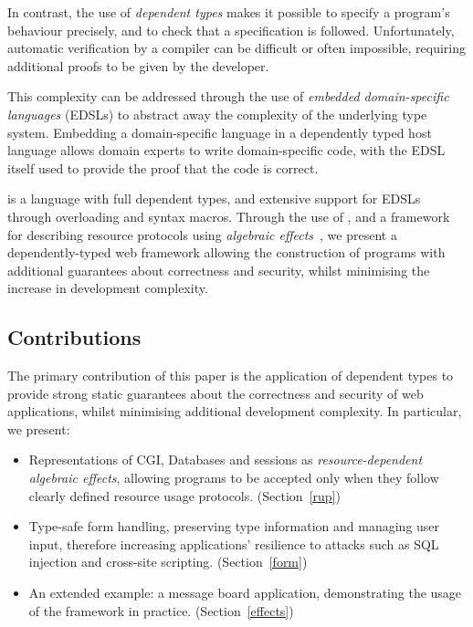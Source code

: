 In contrast, the use of \textit{dependent types} makes it possible
to specify a program's behaviour precisely, and to check that a 
specification is followed.
%
Unfortunately, automatic verification by a compiler can be difficult or
often impossible, requiring additional proofs to be given by the developer.

This complexity can be addressed through the use of \textit{embedded
domain-specific languages} (EDSLs) to abstract away the complexity of the
underlying type system. Embedding a domain-specific language in
a dependently typed host language
allows domain experts to write 
domain-specific code, with the EDSL itself used to provide the proof that the
code is correct.

\idris{} \cite{brady2013idris} is a language with full dependent types, and
extensive support for EDSLs through overloading and syntax macros. Through the
use of \idris{}, and a framework for describing resource protocols using
\emph{algebraic effects}~\cite{brady:effects}, we
present a dependently-typed web framework allowing the construction of
programs with additional guarantees about correctness and security, whilst
minimising the increase in development complexity. 

\subsection{Contributions}
The primary contribution of this paper is the application of 
dependent types to provide strong static guarantees
about the correctness and security of web applications, whilst minimising
additional development complexity. In particular, we present:

\begin{itemize}
\item Representations of CGI, Databases and sessions as
\textit{resource-dependent algebraic effects}, allowing programs to be accepted
only when they follow clearly defined resource usage protocols. 
(Section~\ref{rup})

\item Type-safe form handling, preserving type information and managing
user input, therefore increasing applications' resilience to attacks such as
SQL injection and cross-site scripting. (Section~\ref{form})

\item An extended example: a message board application, demonstrating the usage
of the framework in practice. (Section~\ref{effects})

\end{itemize}


